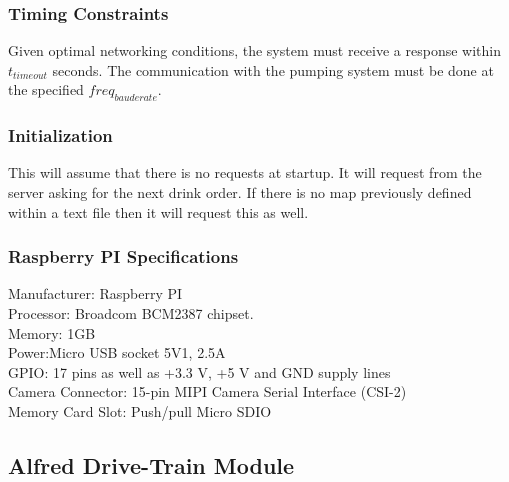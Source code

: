 \documentclass [10pt]{article}
\begin{document}

\subsubsection{Timing Constraints}
Given optimal networking conditions, the system must receive a response within  $ t_{timeout} $ seconds. The communication with the pumping system must be done at the specified $freq_{bauderate}$.


\subsubsection{Initialization}
This will assume that there is no requests at startup. It will request from the server asking for the next drink order. If there is no map previously defined within a text file then it will request this as well.



\subsubsection{Raspberry PI Specifications}
Manufacturer: Raspberry PI \\
Processor: Broadcom BCM2387 chipset. \\
Memory: 1GB \\
Power:Micro USB socket 5V1, 2.5A\\
GPIO: 17 pins as well as +3.3 V, +5 V and GND supply lines\\
Camera Connector: 15-pin MIPI Camera Serial Interface (CSI-2)\\
Memory Card Slot: Push/pull Micro SDIO\\


\subsection{Alfred Drive-Train Module}

\end{document}
